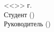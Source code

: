 \documentclass[a4paper, 14pt]{extreport}
\begin{document}
    \pagestyle{empty}
    \vspace{\fill}
    \noindent<<\underline{\hspace{1cm}}>> \underline{\hspace{5cm}} \the\year г.\\
    Студент \hspace{1cm} \underline{\hspace{6cm}} \hspace{2cm} (\underline{\hspace{5cm}})\\
    Руководитель \underline{\hspace{6cm}} \hspace{2cm} (\underline{\hspace{5cm}})\\
\end{document}
